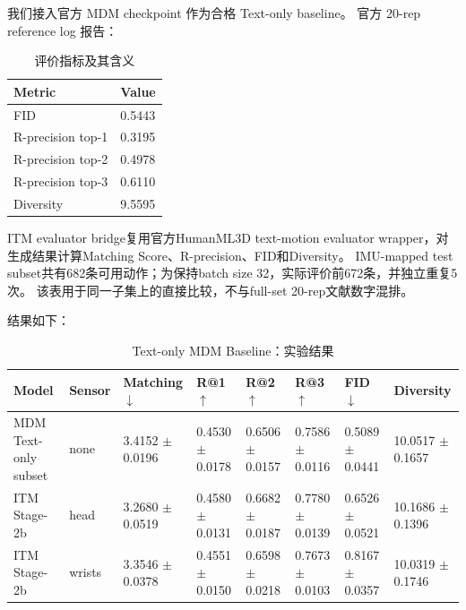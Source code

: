 我们接入官方 MDM checkpoint 作为合格 Text-only baseline。
官方 20-rep reference log 报告：

\begin{table}[t]
\centering
\caption{评价指标及其含义}
\label{tab:result-8}
\footnotesize
\setlength{\tabcolsep}{3pt}
\renewcommand{\arraystretch}{1.15}
\begin{tabularx}{\linewidth}{LL}
\toprule
Metric & Value \\
\midrule
FID & 0.5443 \\
R-precision top-1 & 0.3195 \\
R-precision top-2 & 0.4978 \\
R-precision top-3 & 0.6110 \\
Diversity & 9.5595 \\
\bottomrule
\end{tabularx}
\end{table}


ITM evaluator bridge复用官方HumanML3D text-motion evaluator wrapper，对生成结果计算Matching Score、R-precision、FID和Diversity。
IMU-mapped test subset共有682条可用动作；为保持batch size 32，实际评价前672条，并独立重复5次。
该表用于同一子集上的直接比较，不与full-set 20-rep文献数字混排。

结果如下：

\begin{table}[t]
\centering
\caption{Text-only MDM Baseline：实验结果}
\label{tab:result-9}
\footnotesize
\setlength{\tabcolsep}{3pt}
\renewcommand{\arraystretch}{1.15}
\begin{tabularx}{\linewidth}{LLLLLLLL}
\toprule
Model & Sensor & Matching \ensuremath{\downarrow} & R@1 \ensuremath{\uparrow} & R@2 \ensuremath{\uparrow} & R@3 \ensuremath{\uparrow} & FID \ensuremath{\downarrow} & Diversity \\
\midrule
MDM Text-only subset & none & 3.4152 \ensuremath{\pm} 0.0196 & 0.4530 \ensuremath{\pm} 0.0178 & 0.6506 \ensuremath{\pm} 0.0157 & 0.7586 \ensuremath{\pm} 0.0116 & 0.5089 \ensuremath{\pm} 0.0441 & 10.0517 \ensuremath{\pm} 0.1657 \\
ITM Stage-2b & head & 3.2680 \ensuremath{\pm} 0.0519 & 0.4580 \ensuremath{\pm} 0.0131 & 0.6682 \ensuremath{\pm} 0.0187 & 0.7780 \ensuremath{\pm} 0.0139 & 0.6526 \ensuremath{\pm} 0.0521 & 10.1686 \ensuremath{\pm} 0.1396 \\
ITM Stage-2b & wrists & 3.3546 \ensuremath{\pm} 0.0378 & 0.4551 \ensuremath{\pm} 0.0150 & 0.6598 \ensuremath{\pm} 0.0218 & 0.7673 \ensuremath{\pm} 0.0103 & 0.8167 \ensuremath{\pm} 0.0357 & 10.0319 \ensuremath{\pm} 0.1746 \\
\bottomrule
\end{tabularx}
\end{table}


